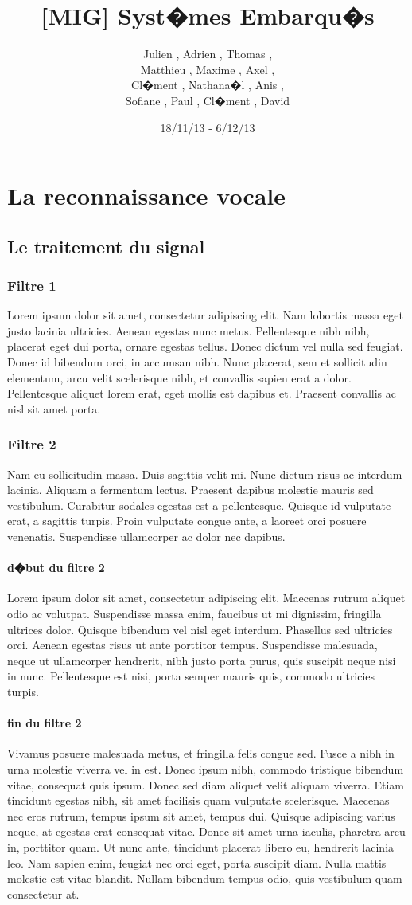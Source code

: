 \documentclass[a4paper,12pt]{report} %
\title{[MIG] Syst�mes Embarqu�s}
\author{Julien \bsc{Caillard}, Adrien \bsc{De La Vaissi�re}, Thomas \bsc{Debarre},\\ Matthieu \bsc{Denoux}, Maxime \bsc{Ernoult}, Axel \bsc{Goering},\\ Cl�ment \bsc{Joudet}, Nathana�l \bsc{Kasriel}, Anis \bsc{Khlif},\\ Sofiane \bsc{Mahiou}, Paul \bsc{Musti�re}, Cl�ment \bsc{Roig}, David \bsc{Vitoux}}
\date{18/11/13 - 6/12/13}
\let\nonewpagechapter\chapter
\begin{document}
\maketitle
\tableofcontents

\part{La reconnaissance vocale}
    \nonewpagechapter{Le traitement du signal}
        \section{Filtre 1}
        	Lorem ipsum dolor sit amet\cite{ref1}, consectetur adipiscing elit. Nam lobortis massa eget justo lacinia ultricies. Aenean egestas nunc metus. Pellentesque nibh nibh, placerat eget dui porta, ornare egestas tellus. Donec dictum vel nulla sed feugiat. Donec id bibendum orci, in accumsan nibh. Nunc placerat, sem et sollicitudin elementum, arcu velit scelerisque nibh, et convallis sapien erat a dolor. Pellentesque aliquet lorem erat, eget mollis est dapibus et. Praesent convallis ac nisl sit amet porta.
        \section{Filtre 2}
        	Nam eu sollicitudin massa. Duis sagittis velit mi. Nunc dictum risus ac interdum lacinia\cite{ref2}. Aliquam a fermentum lectus. Praesent dapibus molestie mauris sed vestibulum. Curabitur sodales egestas est a pellentesque. Quisque id vulputate erat, a sagittis turpis. Proin vulputate congue ante, a laoreet orci posuere venenatis. Suspendisse ullamcorper ac dolor nec dapibus.
        \subsection{d�but du filtre 2}
        	Lorem ipsum dolor sit amet, consectetur adipiscing elit. Maecenas rutrum aliquet odio ac volutpat. Suspendisse massa enim, faucibus ut mi dignissim, fringilla ultrices dolor. Quisque bibendum vel nisl eget interdum. Phasellus sed ultricies orci. Aenean egestas risus ut ante porttitor tempus. Suspendisse malesuada, neque ut ullamcorper hendrerit, nibh justo porta purus, quis suscipit neque nisi in nunc. Pellentesque est nisi, porta semper mauris quis, commodo ultricies turpis.
        \subsection{fin du filtre 2}
        	Vivamus posuere malesuada metus, et fringilla felis congue sed. Fusce a nibh in urna molestie viverra vel in est. Donec ipsum nibh, commodo tristique bibendum vitae, consequat quis ipsum. Donec sed diam aliquet velit aliquam viverra. Etiam tincidunt egestas nibh, sit amet facilisis quam vulputate scelerisque. Maecenas nec eros rutrum, tempus ipsum sit amet, tempus dui. Quisque adipiscing varius neque, at egestas erat consequat vitae. Donec sit amet urna iaculis, pharetra arcu in, porttitor quam. Ut nunc ante, tincidunt placerat libero eu, hendrerit lacinia leo. Nam sapien enim, feugiat nec orci eget, porta suscipit diam. Nulla mattis molestie est vitae blandit. Nullam bibendum tempus odio, quis vestibulum quam consectetur at. 
\end{document}
